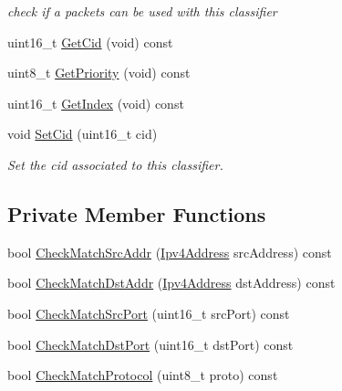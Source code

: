 \begin{DoxyCompactItemize}
\begin{DoxyCompactList}\small\item\em check if a packets can be used with this classifier \end{DoxyCompactList}\item 
uint16\+\_\+t \hyperlink{classns3_1_1IpcsClassifierRecord_aaec81fd951283bb447ebbd3c4fcb3272}{Get\+Cid} (void) const 
\item 
uint8\+\_\+t \hyperlink{classns3_1_1IpcsClassifierRecord_a4bdefe598f5d6a128c05073dd42f9d6c}{Get\+Priority} (void) const 
\item 
uint16\+\_\+t \hyperlink{classns3_1_1IpcsClassifierRecord_abbee6f42b238ba278498182ef12d5e72}{Get\+Index} (void) const 
\item 
void \hyperlink{classns3_1_1IpcsClassifierRecord_ad5ac5eaa34b17764530555ad55a8fd68}{Set\+Cid} (uint16\+\_\+t cid)
\begin{DoxyCompactList}\small\item\em Set the cid associated to this classifier. \end{DoxyCompactList}\end{DoxyCompactItemize}
\subsection*{Private Member Functions}
\begin{DoxyCompactItemize}
\item 
bool \hyperlink{classns3_1_1IpcsClassifierRecord_a6919d65beccaf902569d92f5f4fe0aef}{Check\+Match\+Src\+Addr} (\hyperlink{classns3_1_1Ipv4Address}{Ipv4\+Address} src\+Address) const 
\item 
bool \hyperlink{classns3_1_1IpcsClassifierRecord_a86c218761344c8208f0f20810f91d886}{Check\+Match\+Dst\+Addr} (\hyperlink{classns3_1_1Ipv4Address}{Ipv4\+Address} dst\+Address) const 
\item 
bool \hyperlink{classns3_1_1IpcsClassifierRecord_a7b39a1ebf70e5d93c6bb290d8d38a854}{Check\+Match\+Src\+Port} (uint16\+\_\+t src\+Port) const 
\item 
bool \hyperlink{classns3_1_1IpcsClassifierRecord_ad9b047a3a4106014b57a9fa96bb3b59c}{Check\+Match\+Dst\+Port} (uint16\+\_\+t dst\+Port) const 
\item 
bool \hyperlink{classns3_1_1IpcsClassifierRecord_a00cd1e3609ba14dee54983607cc43739}{Check\+Match\+Protocol} (uint8\+\_\+t proto) const 
\end{DoxyCompactItemize}
